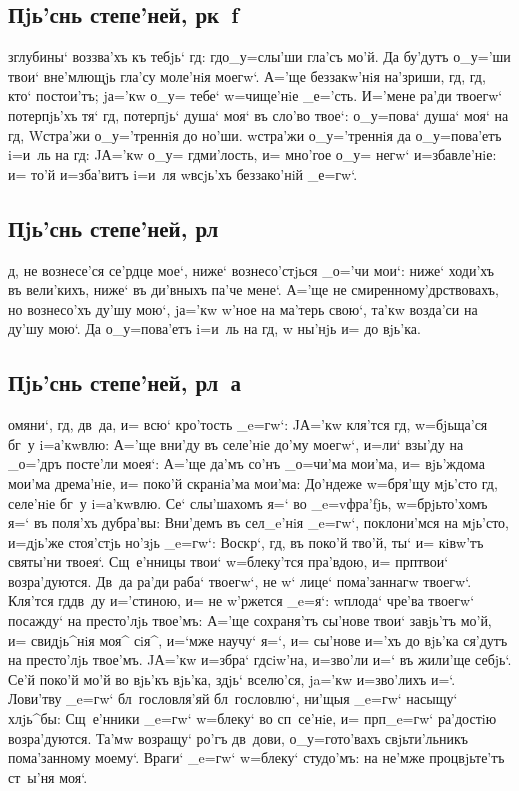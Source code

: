 \documentclass[12pt,twoside,a6paper,xdvi,civil=antiqua]{hipbook}
\begin{document}
\slava

\delimpict

\subsection{Пjь'снь степе'ней, рк~f}

з\ъ глубины` воззва'хъ къ тебjь` гд: гд о_у=слы'ши гла'съ
мо'й. Да бу'дутъ о_у='ши твои` вне'млющjь гла'су моле'нiя моегw`. А='ще
беззакw'нiя на'зриши, гд, гд, кто` постои'тъ; jа='кw о_у= тебе`
w=чище'нiе _е='сть. И='мене ра'ди твоегw` потерпjь'хъ тя` гд, потерпjь`
душа` моя` въ сло'во твое`: о_у=пова` душа` моя` на гд, W\т стра'жи
о_у='треннiя до но'ши. w\т стра'жи о_у='треннiя да о_у=пова'етъ i=и~ль на
гд: JА='кw о_у= гд ми'лость, и= мно'гое о_у= негw` и=збавле'нiе: и= то'й
и=зба'витъ i=и~ля w\т всjь'хъ беззако'нiй _е=гw`.

\delimpict

\subsection{Пjь'снь степе'ней, рл~}

д, не вознесе'ся се'рдце мое`, ниже` вознесо'стjься _о='чи мои`:
ниже` ходи'хъ въ вели'кихъ, ниже` въ ди'вныхъ па'че мене`. А='ще не
смиренному'дрствовахъ, но вознесо'хъ ду'шу мою`, jа='кw w'ное на ма'терь
свою`, та'кw возда'си на ду'шу мою`. Да о_у=пова'етъ i=и~ль на гд, w\т
ны'нjь и= до вjь'ка.

\delimpict

\subsection{Пjь'снь степе'ней, рл~а}

омяни`, гд, дв~да, и= всю` кро'тость _e=гw`: JА='кw кля'тся гд,
w=бjьща'ся бг~у i=а'\-кwв\-лю: А='ще вни'ду въ селе'нiе до'му моегw`, и=ли`
взы'ду на _о='дръ посте'ли моея`: А='ще да'мъ со'нъ _о=чи'ма мои'ма, и=
вjь'ждома мои'ма дрема'нiе, и= поко'й скранiа'ма мои'ма: До'ндеже w=бря'щу
мjь'сто гд, селе'нiе бг~у i=а'кwвлю. Се` слы'шахомъ я=` во _e=vфра'fjь,
w=брjьто'хомъ я=` въ поля'хъ дубра'вы: Вни'демъ въ сел_e'нiя _e=гw`,
поклони'мся на мjь'сто, и=дjь'же стоя'стjь но'зjь _e=гw`: Воскр`, гд,
въ поко'й тво'й, ты` и= кiвw'тъ святы'ни твоея`. Сщ~е'нницы твои` w=блеку'тся
пра'вдою, и= прп твои` возра'дуются. Дв~да ра'ди раба` твоегw`, не
w` лице` пома'заннагw твоегw`. Кля'тся гд дв~ду и='стиною, и= не
w'ржется _e=я`: w\т плода` чре'ва твоегw` посажду` на пре\-сто'\-лjь
твое'мъ: А='ще сохраня'тъ сы'нове твои` за\-вjь'тъ мо'й, и= свидjь^нiя моя^
сiя^, и=`мже научу` я=`, и= сы'нове и='хъ до вjь'ка ся'дутъ на престо'лjь
твое'мъ.  JА='кw и=збра` гд сiw'на, и=зво'ли и=` въ жили'ще себjь`. Се'й
поко'й мо'й во вjь'къ вjь'ка, здjь` вселю'ся, ja='кw и=зво'лихъ и=`. Лови'тву
_e=гw` бл~гословля'яй бл~гословлю`, ни'щыя _e=гw` насыщу` хлjь^бы: Сщ~е'нники
_e=гw` w=блеку` во сп~се'нiе, и= прп _e=гw` ра'достiю возра'дуются.
Та'мw возращу` ро'гъ дв~дови, о_у=гото'вахъ свjьти'льникъ пома'занному моему`.
Враги` _e=гw` w=блеку` студо'мъ: на не'мже процвjьте'тъ ст~ы'ня моя`.
\end{document}
